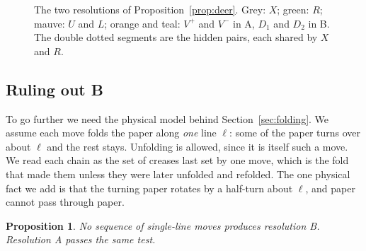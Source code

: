 \documentclass[11pt]{article}
\newtheorem{proposition}[theorem]{Proposition}
\theoremstyle{definition}
\theoremstyle{remark}
\begin{document}
\begin{figure}[t]
\centering
{}
\caption{The two resolutions of Proposition~\ref{prop:deer}. Grey: $X$; green: $R$; mauve: $U$ and $L$; orange and teal: $V^+$ and $V^-$ in A, $D_1$ and $D_2$ in B. The double dotted segments are the hidden pairs, each shared by $X$ and $R$.}
\label{fig:deerres}
\end{figure}

\subsection{Ruling out B}

To go further we need the physical model behind Section~\ref{sec:folding}. We assume each move folds the paper along \emph{one} line $\ell$: some of the paper turns over about $\ell$ and the rest stays. Unfolding is allowed, since it is itself such a move. We read each chain as the set of creases last set by one move, which is the fold that made them unless they were later unfolded and refolded. The one physical fact we add is that the turning paper rotates by a half-turn about $\ell$, and paper cannot pass through paper.

\begin{proposition}\label{prop:notB}
No sequence of single-line moves produces resolution B. Resolution A passes the same test.
\end{proposition}
\end{document}
